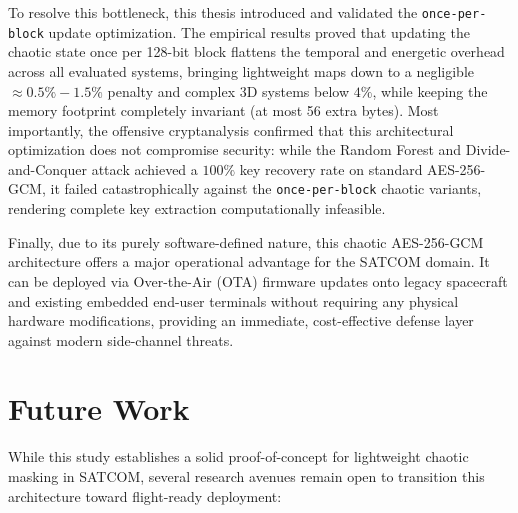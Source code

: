 \documentclass[11pt,a4paper]{report}
\begin{document}
To resolve this bottleneck, this thesis introduced and validated the \texttt{once-per-block} update optimization. 
The empirical results proved that updating the chaotic state once per 128-bit block flattens the temporal and energetic overhead across all evaluated systems, bringing lightweight maps down to a negligible $\approx 0.5\% - 1.5\%$ penalty and complex 3D systems below $4\%$,
while keeping the memory footprint completely invariant (at most 56 extra bytes).
Most importantly, the offensive cryptanalysis confirmed that this architectural optimization does not compromise security: 
while the Random Forest and Divide-and-Conquer attack achieved a $100\%$ key recovery rate on standard AES-256-GCM, it failed catastrophically against the \texttt{once-per-block} chaotic variants, 
rendering complete key extraction computationally infeasible.

Finally, due to its purely software-defined nature, this chaotic AES-256-GCM architecture offers a major operational advantage for the SATCOM domain. 
It can be deployed via Over-the-Air (OTA) firmware updates onto legacy spacecraft and existing embedded end-user terminals without requiring any physical hardware modifications, 
providing an immediate, cost-effective defense layer against modern side-channel threats.

\section{Future Work}
While this study establishes a solid proof-of-concept for lightweight chaotic masking in SATCOM, several research avenues remain open to transition this architecture toward flight-ready deployment:
\end{document}
